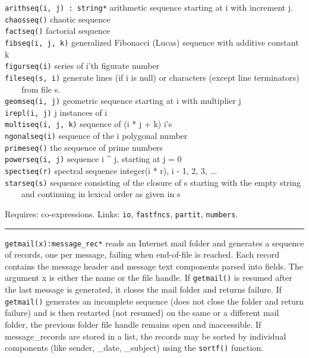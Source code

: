 \texttt{arithseq(i, j) : string*} arithmetic sequence starting at i with
increment j.\\
\texttt{chaosseq()} chaotic sequence\\
\texttt{factseq()} factorial sequence\\
\texttt{fibseq(i, j, k)} generalized Fibonacci (Lucas) sequence with
additive constant k\\
\texttt{figurseq(i)} series of i'th figurate
number\\
\texttt{fileseq(s, i)} generate lines (if i is null) or characters
(except line terminators)\\
 \ \ \ \ from file s.\\
\texttt{geomseq(i, j)} geometric sequence starting at i with multiplier
j\\
\texttt{irepl(i, j)} j instances of i\\
\texttt{multiseq(i, j, k)} sequence of (i * j + k)
i's\\
\texttt{ngonalseq(i)} sequence of the i polygonal number\\
\texttt{primeseq()} the sequence of prime numbers\\
\texttt{powerseq(i, j)} sequence i \^{} j, starting at j = 0\\
\texttt{spectseq(r)} spectral sequence integer(i * r), i - 1, 2, 3,
...\\
\texttt{starseq(s)} sequence consisting of the closure of s starting
with the empty string\\
 \ \ \ \ and continuing in lexical order as given in s

Requires: co-expressions. Links: \texttt{io}, \texttt{fastfncs},
\texttt{partit}, \texttt{numbers}. 

\vspace{0.25cm}\hrule{}

\texttt{getmail(x):message\_rec*} reads an Internet mail folder and generates a sequence of records, one per message,
failing when end-of-file is reached. Each record contains the message
header and message text components parsed into fields. The argument x
is either the name or the file handle. If \texttt{getmail()} is resumed after
the last message is generated, it closes the mail folder and returns
failure. If \texttt{getmail()} generates an incomplete sequence (does
not close the folder and return failure) and is then restarted (not
resumed) on the same or a different mail folder, the previous folder
file handle remains open and inaccessible. If message\_records are
stored in a list, the records may be sorted by individual components
(like sender, \_date, \_subject) using the \texttt{sortf()} function.


